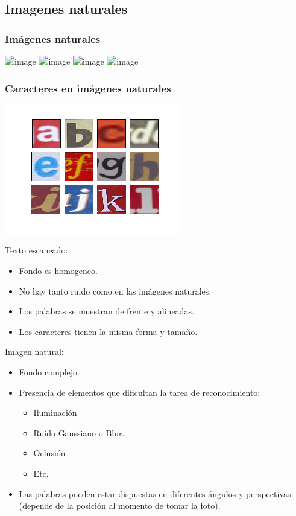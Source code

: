	\subsection{Imagenes naturales}
		\begin{frame}
			\frametitle{Imágenes naturales}
			\begin{center}
				\includegraphics<1>[height=0.65\paperheight]{imgs/imagen_natural_1.jpg}
				\includegraphics<2>[height=0.65\paperheight]{imgs/imagen_natural_2.jpg}
				\includegraphics<3>[height=0.65\paperheight]{imgs/imagen_natural_3.jpg}
				\includegraphics<4>[height=0.65\paperheight]{imgs/imagen_natural_4.jpg}	
			\end{center}
		\end{frame}
		\begin{frame}
			\frametitle{Caracteres en imágenes naturales}
			\includegraphics[height=0.65\paperheight]{imgs/caracteres_naturales.png}	
		\end{frame}
		\begin{frame}
			Texto escaneado:
			\begin{itemize}
				\item Fondo es homogeneo.
				\item No hay tanto ruido como en las imágenes naturales.
				\item Los palabras se muestran de frente y alineadas.
				\item Los caracteres tienen la misma forma y tamaño.
			\end{itemize}
		\end{frame}
		\begin{frame}
			Imagen natural:
			\begin{itemize}
				\item Fondo complejo.
				\item Presencia de elementos que dificultan la tarea de reconocimiento:
				\begin{itemize}
					\item Iluminación
					\item Ruido Gaussiano o Blur.
					\item Oclusión
					\item Etc.
				\end{itemize}
				\item Las palabras pueden estar dispuestas en diferentes ángulos y perspectivas (depende de la posición al momento de tomar la foto).
			\end{itemize}
		\end{frame}
